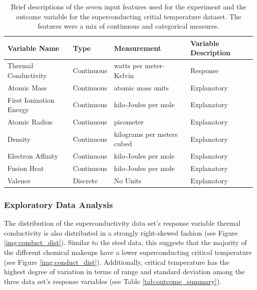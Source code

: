 \documentclass[10pt]{article}\usepackage[]{graphicx}\usepackage[]{xcolor}
\begin{document}
\begin{table}[h!]
  \begin{center}
    \begin{tabular}{l|l|l|l}
      \textbf{Variable Name} & \textbf{Type} & \textbf{Measurement} & \textbf{Variable Description}\\
      \hline
      Thermal Conductivity & Continuous & watts per meter-Kelvin &  Response\\
      Atomic Mass & Continuous & atomic mass units & Explanatory  \\
      First Ionization Energy & Continuous & kilo-Joules per mole & Explanatory \\
      Atomic Radius & Continuous & picometer & Explanatory \\
      Density & Continuous & kilograms per meters cubed & Explanatory \\
      Electron Affinity & Continuous & kilo-Joules per mole & Explanatory \\
      Fusion Heat & Continuous & kilo-Joules per mole & Explanatory \\
      Valence & Discrete & No Units & Explanatory \\
    \end{tabular}
    \caption{Brief descriptions of the seven input features used for the experiment and the outcome variable for the superconducting critial temperature dataset. The features were a mix of continuous and categorical measures.}
    \label{tab:conduct_vars}
  \end{center}
\end{table}

\subsubsection{Exploratory Data Analysis}
The distribution of the superconductivity data set's response variable thermal conductivity is also distributed in a strongly right-skewed fashion (see Figure \ref{img:conduct_dist}). Similar to the steel data, this suggests that the majority of the different chemical makeups have a lower superconducting critical temperature (see Figure \ref{img:conduct_dist}). Additionally, critical temperature has the highest degree of variation in terms of range and standard deviation among the three data set's response variables (see Table \ref{tab:outcome_summary}). \\
\end{document}

